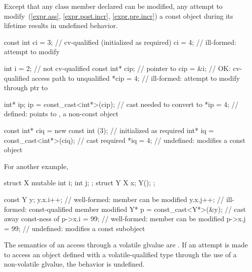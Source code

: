 \pnum
{}%
Except that any class member declared 
can be modified, any attempt to modify~(\ref{expr.ass},
\ref{expr.post.incr}, \ref{expr.pre.incr}) a
const object during its
lifetime results in undefined behavior.
\begin{example}
\begin{codeblock}
const int ci = 3;                       // cv-qualified (initialized as required)
ci = 4;                                 // ill-formed: attempt to modify 

int i = 2;                              // not cv-qualified
const int* cip;                         // pointer to 
cip = &i;                               // OK: cv-qualified access path to unqualified
*cip = 4;                               // ill-formed: attempt to modify through ptr to 

int* ip;
ip = const_cast<int*>(cip);             // cast needed to convert  to 
*ip = 4;                                // defined:  points to , a non-const object

const int* ciq = new const int (3);     // initialized as required
int* iq = const_cast<int*>(ciq);        // cast required
*iq = 4;                                // undefined: modifies a const object
\end{codeblock}
For another example,
\begin{codeblock}
struct X {
  mutable int i;
  int j;
};
struct Y {
  X x;
  Y();
};

const Y y;
y.x.i++;                                // well-formed:  member can be modified
y.x.j++;                                // ill-formed: const-qualified member modified
Y* p = const_cast<Y*>(&y);              // cast away const-ness of 
p->x.i = 99;                            // well-formed:  member can be modified
p->x.j = 99;                            // undefined: modifies a const subobject
\end{codeblock}
\end{example}

\pnum
The semantics of an access through a volatile glvalue are
.
If an attempt is made to access an object defined with a
volatile-qualified type through the use of a non-volatile glvalue,
the behavior is undefined.

